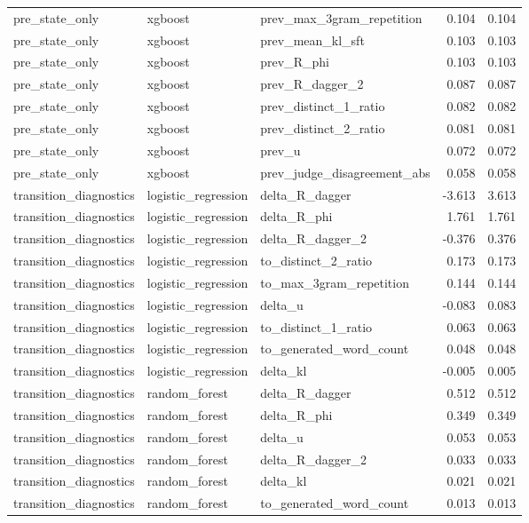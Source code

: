 \begin{tabular}{lllrr}
pre_state_only & xgboost & prev_max_3gram_repetition & 0.104 & 0.104 \\
pre_state_only & xgboost & prev_mean_kl_sft & 0.103 & 0.103 \\
pre_state_only & xgboost & prev_R_phi & 0.103 & 0.103 \\
pre_state_only & xgboost & prev_R_dagger_2 & 0.087 & 0.087 \\
pre_state_only & xgboost & prev_distinct_1_ratio & 0.082 & 0.082 \\
pre_state_only & xgboost & prev_distinct_2_ratio & 0.081 & 0.081 \\
pre_state_only & xgboost & prev_u & 0.072 & 0.072 \\
pre_state_only & xgboost & prev_judge_disagreement_abs & 0.058 & 0.058 \\
transition_diagnostics & logistic_regression & delta_R_dagger & -3.613 & 3.613 \\
transition_diagnostics & logistic_regression & delta_R_phi & 1.761 & 1.761 \\
transition_diagnostics & logistic_regression & delta_R_dagger_2 & -0.376 & 0.376 \\
transition_diagnostics & logistic_regression & to_distinct_2_ratio & 0.173 & 0.173 \\
transition_diagnostics & logistic_regression & to_max_3gram_repetition & 0.144 & 0.144 \\
transition_diagnostics & logistic_regression & delta_u & -0.083 & 0.083 \\
transition_diagnostics & logistic_regression & to_distinct_1_ratio & 0.063 & 0.063 \\
transition_diagnostics & logistic_regression & to_generated_word_count & 0.048 & 0.048 \\
transition_diagnostics & logistic_regression & delta_kl & -0.005 & 0.005 \\
transition_diagnostics & random_forest & delta_R_dagger & 0.512 & 0.512 \\
transition_diagnostics & random_forest & delta_R_phi & 0.349 & 0.349 \\
transition_diagnostics & random_forest & delta_u & 0.053 & 0.053 \\
transition_diagnostics & random_forest & delta_R_dagger_2 & 0.033 & 0.033 \\
transition_diagnostics & random_forest & delta_kl & 0.021 & 0.021 \\
transition_diagnostics & random_forest & to_generated_word_count & 0.013 & 0.013 \\

\end{tabular}
